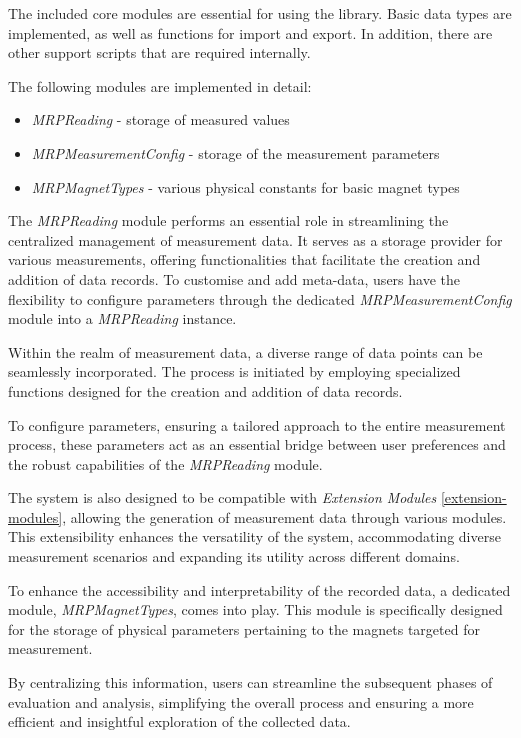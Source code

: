 The included core modules are essential for using the library. Basic
data types are implemented, as well as functions for import and export.
In addition, there are other support scripts that are required
internally.

The following modules are implemented in detail:

\begin{itemize}
\tightlist
\item
  \emph{MRPReading} - storage of measured values
\item
  \emph{MRPMeasurementConfig} - storage of the measurement parameters
\item
  \emph{MRPMagnetTypes} - various physical constants for basic magnet
  types
\end{itemize}

The \emph{MRPReading} module performs an essential role in streamlining
the centralized management of measurement data. It serves as a storage
provider for various measurements, offering functionalities that
facilitate the creation and addition of data records. To customise and
add meta-data, users have the flexibility to configure parameters
through the dedicated \emph{MRPMeasurementConfig} module into a
\emph{MRPReading} instance.

Within the realm of measurement data, a diverse range of data points can
be seamlessly incorporated. The process is initiated by employing
specialized functions designed for the creation and addition of data
records.

To configure parameters, ensuring a tailored approach to the entire
measurement process, these parameters act as an essential bridge between
user preferences and the robust capabilities of the \emph{MRPReading}
module.

The system is also designed to be compatible with \emph{Extension
Modules} \ref{extension-modules}, allowing the generation of measurement
data through various modules. This extensibility enhances the
versatility of the system, accommodating diverse measurement scenarios
and expanding its utility across different domains.

To enhance the accessibility and interpretability of the recorded data,
a dedicated module, \emph{MRPMagnetTypes}, comes into play. This module
is specifically designed for the storage of physical parameters
pertaining to the magnets targeted for measurement.

By centralizing this information, users can streamline the subsequent
phases of evaluation and analysis, simplifying the overall process and
ensuring a more efficient and insightful exploration of the collected
data.

